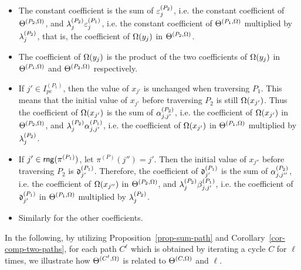 \begin{itemize}
\item The constant coefficient is the sum of $\varepsilon^{(P_2)}_{j}$, i.e. the constant coefficient of $\Theta^{(P_2, \Omega)}$,  and $\lambda^{(P_2)}_{j} \varepsilon^{(P_1)}_{j}$, i.e. the constant coefficient of  $\Theta^{(P_1, \Omega)}$ multiplied by $\lambda^{(P_2)}_{j} $, that is, the coefficient of $\Omega(y_j)$ in $\Theta^{(P_2, \Omega)}$.
%
\item The coefficient of $\Omega(y_j)$ is the product of the two coefficients of $\Omega(y_j)$ in $\Theta^{(P_1, \Omega)}$ and $\Theta^{(P_2, \Omega)}$ respectively.
%
\item If $j' \in I^{(P_1)}_{pe}$, then the value of $x_{j'}$ is unchanged when traversing $P_1$. This means that the initial value of $x_{j'}$ before traversing $P_2$ is still $\Omega(x_{j'})$. Thus the coefficient of $\Omega(x_{j'})$ is the sum of $\alpha^{(P_2)}_{j,j'}$, i.e. the coefficient of $\Omega(x_{j'})$ in $\Theta^{(P_2, \Omega)}$, and $\lambda^{(P_2)}_{j} \alpha^{(P_1)}_{j,j'}$, i.e. the coefficient of $\Omega(x_{j'})$ in $\Theta^{(P_1, \Omega)}$ multiplied by $\lambda^{(P_2)}_{j}$.
%
\item If $j' \in \mathsf{rng}(\pi^{(P_1)})$, let $\pi^{(P)}(j'')=j'$. Then the initial value of $x_{j''}$ before traversing $P_2$ is $\mathfrak{d}^{(P_1)}_{j'}$. Therefore, the coefficient of $\mathfrak{d}^{(P_1)}_{j'}$ is the sum of $\alpha^{(P_2)}_{j,j''}$, i.e. the coefficient of $\Omega(x_{j''})$ in $\Theta^{(P_2, \Omega)}$, and $\lambda^{(P_2)}_{j} \beta^{(P_1)}_{j,j'}$, i.e. the coefficient of $\mathfrak{d}^{(P_1)}_{j'}$ in $\Theta^{(P_1, \Omega)}$ multiplied by $\lambda^{(P_2)}_{j}$.
%
\item Similarly for the other coefficients.
\end{itemize}

In the following, by utilizing Proposition~\ref{prop-sum-path} and Corollary~\ref{cor-comp-two-paths}, for each path $C^{\ell}$ which is obtained by iterating a cycle $C$ for $\ell$ times, we illustrate how $\Theta^{(C^\ell,\Omega)}$ is related to $\Theta^{(C,\Omega)}$ and $\ell$.





